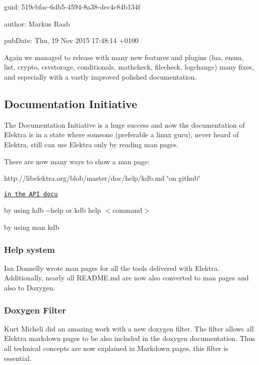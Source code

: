 \begin{DoxyItemize}
\item guid\+: 519cbfac-\/6db5-\/4594-\/8a38-\/dec4c84b134f
\item author\+: Markus Raab
\item pub\+Date\+: Thu, 19 Nov 2015 17\+:48\+:14 +0100
\end{DoxyItemize}

Again we managed to release with many new features and plugins (lua, enum, list, crypto, csvstorage, conditionals, mathcheck, filecheck, logchange) many fixes, and especially with a vastly improved polished documentation.

\subsection*{Documentation Initiative}

The Documentation Initiative is a huge success and now the documentation of Elektra is in a state where someone (preferable a linux guru), never heard of Elektra, still can use Elektra only by reading man pages.

There are now many ways to show a man page\+:


\begin{DoxyItemize}
\item http\+://libelektra.org/blob/master/doc/help/kdb.\+md \char`\"{}on github\char`\"{}
\item \href{http://doc.libelektra.org/api/latest/html/md_doc_help_kdb.html}{\tt in the A\+P\+I docu}
\item by using {\ttfamily kdb -\/-\/help} or {\ttfamily kdb help $<$command$>$}
\item by using {\ttfamily man kdb}
\end{DoxyItemize}

\subsubsection*{Help system}

Ian Donnelly wrote man pages for all the tools delivered with Elektra. Additionally, nearly all R\+E\+A\+D\+M\+E.\+md are now also converted to man pages and also to Doxygen.

\subsubsection*{Doxygen Filter}

Kurt Micheli did an amazing work with a new doxygen filter. The filter allows all Elektra markdown pages to be also included in the doxygen documentation. Thus all technical concepts are now explained in Markdown pages, this filter is essential.

